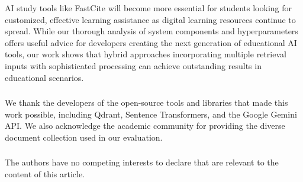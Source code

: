 \documentclass[runningheads]{llncs}
\begin{document}
AI study tools like FastCite will become more essential for students looking for customized, effective learning assistance as digital learning resources continue to spread. While our thorough analysis of system components and hyperparameters offers useful advice for developers creating the next generation of educational AI tools, our work shows that hybrid approaches incorporating multiple retrieval inputs with sophisticated processing can achieve outstanding results in educational scenarios.
%
%
\begin{credits}
\subsubsection{\ackname}
We thank the developers of the open-source tools and libraries that made this work possible, including Qdrant, Sentence Transformers, and the Google Gemini API. We also acknowledge the academic community for providing the diverse document collection used in our evaluation.

\subsubsection{\discintname}
The authors have no competing interests to declare that are relevant to the content of this article.
\end{credits}
%
%
\end{document}
